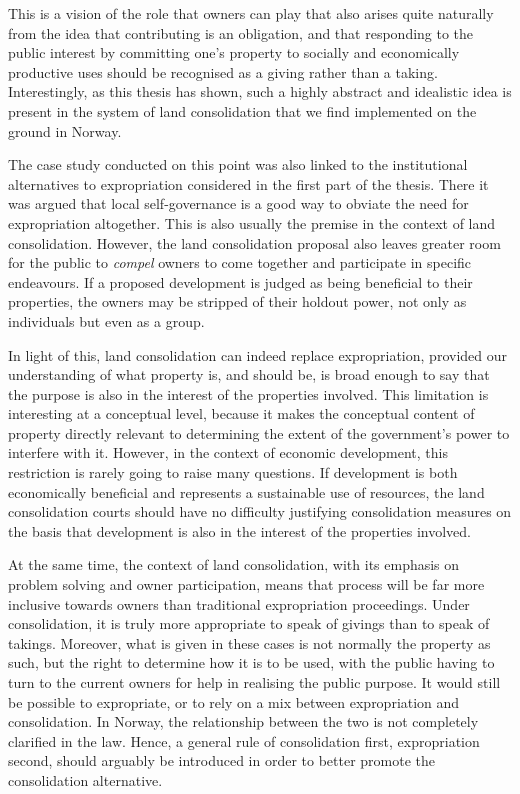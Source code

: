 This is a vision of the role that owners can play that also arises quite naturally from the idea that contributing is an obligation, and that responding to the public interest by committing one's property to socially and economically productive uses should be recognised as a giving rather than a taking. Interestingly, as this thesis has shown, such a highly abstract and idealistic idea is present in the system of land consolidation that we find implemented on the ground in Norway.

The case study conducted on this point was also linked to the institutional alternatives to expropriation considered in the first part of the thesis. There it was argued that local self-governance is a good way to obviate the need for expropriation altogether. This is also usually the premise in the context of land consolidation. However, the land consolidation proposal also leaves greater room for the public to {\it compel} owners to come together and participate in specific endeavours. If a proposed development is judged as being beneficial to their properties, the owners may be stripped of their holdout power, not only as individuals but even as a group.

In light of this, land consolidation can indeed replace expropriation, provided our understanding of what property is, and should be, is broad enough to say that the purpose is also in the interest of the properties involved. This limitation is interesting at a conceptual level, because it makes the conceptual content of property directly relevant to determining the extent of the government's power to interfere with it. However, in the context of economic development, this restriction is rarely going to raise many questions. If development is both economically beneficial and represents a sustainable use of resources, the land consolidation courts should have no difficulty justifying consolidation measures on the basis that development is also in the interest of the properties involved.

At the same time, the context of land consolidation, with its emphasis on problem solving and owner participation, means that process will be far more inclusive towards owners than traditional expropriation proceedings. Under consolidation, it is truly more appropriate to speak of givings than to speak of takings. Moreover, what is given in these cases is not normally the property as such, but the right to determine how it is to be used, with the public having to turn to the current owners for help in realising the public purpose. It would still be possible to expropriate, or to rely on a mix between expropriation and consolidation. In Norway, the relationship between the two is not completely clarified in the law. Hence, a general rule of consolidation first, expropriation second, 
should arguably be introduced in order to better promote the consolidation alternative.

